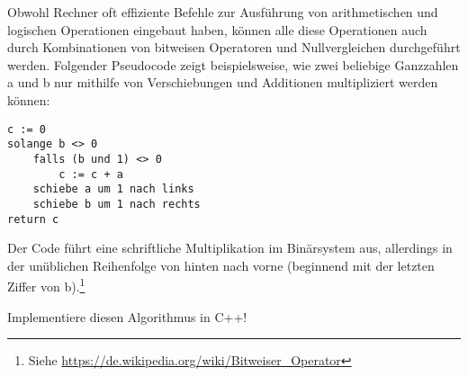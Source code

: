 \begin{task}
Obwohl Rechner oft effiziente Befehle zur Ausführung von arithmetischen und logischen Operationen eingebaut haben, können alle diese Operationen auch durch Kombinationen von bitweisen Operatoren und Nullvergleichen durchgeführt werden. Folgender Pseudocode zeigt beispielsweise, wie zwei beliebige Ganzzahlen a und b nur mithilfe von Verschiebungen und Additionen multipliziert werden können:
\begin{verbatim}
c := 0
solange b <> 0
    falls (b und 1) <> 0
        c := c + a
    schiebe a um 1 nach links
    schiebe b um 1 nach rechts
return c
\end{verbatim}
Der Code führt eine schriftliche Multiplikation im Binärsystem aus, allerdings in der unüblichen Reihenfolge von hinten nach vorne (beginnend mit der letzten Ziffer von b).\footnote{Siehe \url{https://de.wikipedia.org/wiki/Bitweiser_Operator}}

Implementiere diesen Algorithmus in C++!
\end{task}

